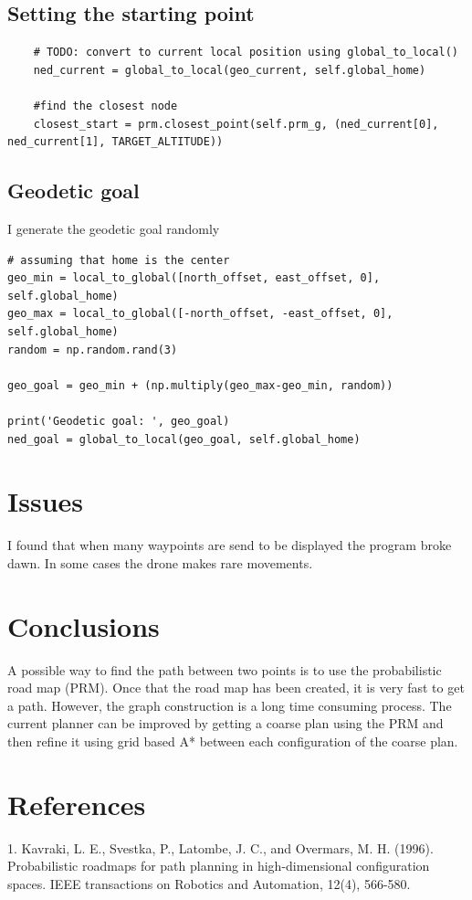\documentclass[]{article}
\begin{document}
\subsection{Setting the starting point}

\begin{verbatim}
	# TODO: convert to current local position using global_to_local()
	ned_current = global_to_local(geo_current, self.global_home)
	
	#find the closest node
	closest_start = prm.closest_point(self.prm_g, (ned_current[0], ned_current[1], TARGET_ALTITUDE))
\end{verbatim}

\subsection{Geodetic goal}

I generate the geodetic goal randomly

\begin{verbatim}
# assuming that home is the center
geo_min = local_to_global([north_offset, east_offset, 0], self.global_home)
geo_max = local_to_global([-north_offset, -east_offset, 0], self.global_home)
random = np.random.rand(3)

geo_goal = geo_min + (np.multiply(geo_max-geo_min, random))

print('Geodetic goal: ', geo_goal)
ned_goal = global_to_local(geo_goal, self.global_home)

\end{verbatim}

\section{Issues}

I found that when many waypoints are send to be displayed the program broke dawn. In some cases the drone makes rare movements. 

\section{Conclusions}

A possible way to find the path between two points is to use the probabilistic road map (PRM). Once that the road map has been created, it is very fast to get a path. However, the graph construction is a long time consuming process. The current planner can be improved by getting a coarse plan using the PRM and then refine it using grid based A* between each configuration of the coarse plan.

\section{References}

1. Kavraki, L. E., Svestka, P., Latombe, J. C., and Overmars, M. H. (1996). Probabilistic roadmaps for path planning in high-dimensional configuration spaces. IEEE transactions on Robotics and Automation, 12(4), 566-580.
\end{document}
